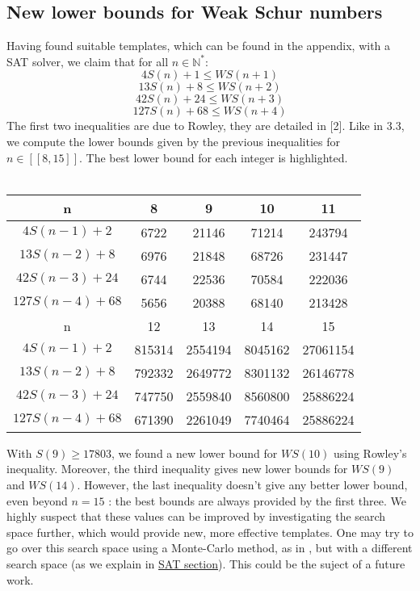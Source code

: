 \subsection{New lower bounds for Weak Schur numbers}
Having found suitable templates, which can be found in the appendix, with a SAT solver, we claim that for all \(n \in
\mathbb{N}^*\):
\[
4S(n) + 1 \leqslant WS(n+1)
\]
\[
13S(n) + 8 \leqslant WS(n+2)
\]
\[
42S(n) + 24 \leqslant WS(n+3)
\]
\[
127S(n) + 68 \leqslant WS(n+4)
\]
The first two inequalities are due to Rowley, they are detailed in [2]. Like in 3.3, we compute the lower bounds given
by the previous inequalities for \( n \in [\![8,15]\!] \). The best lower bound for each integer is highlighted.\\
\\
\begin{center}
\begin{tabular}{|*{5}{c|}}
    \hline
	n & 8 & 9 & 10 & 11 \\
	\hline
	\(4S(n-1) + 2 \) & 6722 & 21146 & \cellcolor{yellow} 71214 & \cellcolor{yellow} 243794\\
	\hline
	\(13S(n-2) + 8 \) & \cellcolor{yellow} 6976 & 21848 & 68726 & 231447\\
	\hline
	\(42S(n-3) + 24 \) & 6744 & \cellcolor{yellow} 22536 & 70584 & 222036 \\
	\hline
	\(127S(n-4) + 68 \) & 5656 & 20388 & 68140 & 213428\\
	\hline
	\hline
	n & 12 & 13 & 14 & 15 \\
	\hline
	\(4S(n-1) + 2 \) & \cellcolor{yellow} 815314 & 2554194 & 8045162 & \cellcolor{yellow} 27061154\\
	\hline
	\(13S(n-2) + 8 \) & 792332 & \cellcolor{yellow}2649772 & 8301132 & 26146778 \\
	\hline
	\(42S(n-3) + 24 \) & 747750 & 2559840 & \cellcolor{yellow} 8560800 &  25886224 \\
	\hline
	\(127S(n-4) + 68 \) & 671390 & 2261049 & 7740464 & 25886224 \\
	\hline
\end{tabular}
\end{center}

With \( S(9) \geqslant 17803 \), we found a new lower bound for
\(WS(10)\) using Rowley's inequality. Moreover, the third inequality
gives new lower bounds for \(WS(9)\) and \(WS(14)\). However, the last
inequality doesn't give any better lower bound, even beyond \( n = 15 \)
: the best bounds are always provided by the first three. We highly suspect that these values can be improved by
investigating the search
space further, which would provide new, more effective templates. One
may try to go over this search space using a Monte-Carlo method, as in \cite{Bouzy2015AnAP},
but with a different search space (as we explain in \hyperref[SAT]{SAT section}).
This could be the suject of a future work.
